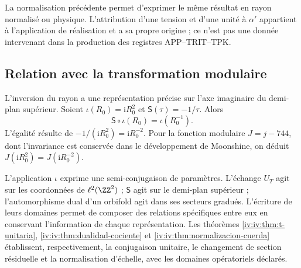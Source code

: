 La normalisation précédente permet d’exprimer le même résultat en
rayon normalisé ou physique. L’attribution d’une tension et d’une
unité à \(\alpha'\) appartient à l’application de réalisation et a
sa propre origine ; ce n’est pas une donnée intervenant dans la production
des registres APP--TRIT--TPK.

\subsection{Relation avec la transformation modulaire}

L’inversion du rayon a une représentation précise sur
l’axe imaginaire du demi-plan supérieur. Soient
\(\iota(R_0)=\mathrm iR_0^2\) et
\(\mathsf S(\tau)=-1/\tau\). Alors
\begin{equation}
 \mathsf S\circ\iota(R_0)=\iota(R_0^{-1}).
 \label{iv:iv:eq:semiconjugacion-modular}
\end{equation}
L’égalité résulte de
\(-1/(\mathrm iR_0^2)=\mathrm iR_0^{-2}\). Pour la fonction
modulaire \(J=j-744\), dont l’invariance est conservée dans le
développement de Moonshine, on déduit
\(J(\mathrm iR_0^2)=J(\mathrm iR_0^{-2})\).

L’application \(\iota\) exprime une semi-conjugaison de paramètres.
L’échange \(U_T\) agit sur les coordonnées de
\(\ell^2(\ZZ^2)\) ; \(\mathsf S\) agit sur le demi-plan
supérieur ; l’automorphisme dual d’un orbifold agit dans ses
secteurs gradués. L’écriture de leurs domaines permet de
composer des relations spécifiques entre eux en conservant
l’information de chaque représentation. Les théorèmes
\ref{iv:iv:thm:t-unitaria}, \ref{iv:iv:thm:dualidad-cociente}
et \ref{iv:iv:thm:normalizacion-cuerda} établissent, respectivement,
la conjugaison unitaire, le changement de section résiduelle et la
normalisation d’échelle, avec les domaines opératoriels déclarés.
